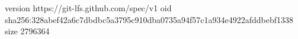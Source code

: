 version https://git-lfs.github.com/spec/v1
oid sha256:328abef42a6c7dbdbc5a3795c910dba0735a94f57c1a934e4922afddbebf1338
size 2796364
